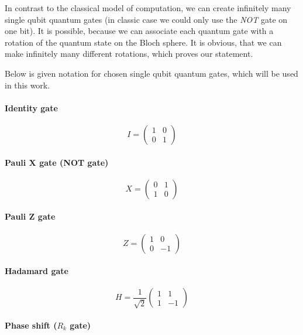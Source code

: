 In contrast to the classical model of computation, we can create infinitely many single qubit quantum gates (in classic case we could only use the \textit{NOT} gate on one bit). It is possible, because we can associate each quantum gate with a rotation of the quantum state on the Bloch sphere. It is obvious, that we can make infinitely many different rotations, which proves our statement.

Below is given notation for chosen single qubit quantum gates, which will be used in this work.

\paragraph{Identity gate}

\[ I = \begin{pmatrix} 1 & 0 \\ 0 & 1 \end{pmatrix} \]

\paragraph{Pauli X gate (NOT gate)}

\[ X = \begin{pmatrix} 0 & 1 \\ 1 & 0 \end{pmatrix} \]

\paragraph{Pauli Z gate}

\[ Z = \begin{pmatrix} 1 & 0 \\ 0 & -1 \end{pmatrix} \]

\paragraph{Hadamard gate}

\[ H =  \frac{1}{\sqrt{2}} \begin{pmatrix} 1 & 1 \\ 1 & -1 \end{pmatrix} \]

\paragraph{Phase shift ($R_k$ gate)}

